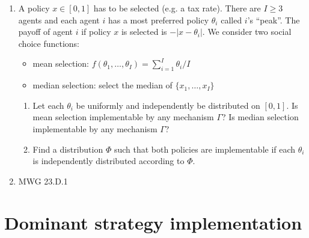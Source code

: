 \documentclass[a4paper,12pt]{article}
\begin{document}
\begin{enumerate}
\item A policy $x\in[0,1]$ has to be selected (e.g. a tax rate). There are $I\geq 3$ agents and each agent $i$ has a most preferred policy $\theta _i$ called $i$'s ``peak''. The payoff of agent $i$ if policy $x$ is selected is $-|x-\theta _i|$. We consider two social choice functions:
  \begin{itemize}
  \item mean selection: $f(\theta _1,\dots,\theta _I)=\sum_{i=1}^I\theta _i/I$
    \item median selection: select the median of $\{x_1,\dots,x_I\}$
  \end{itemize}
  \begin{enumerate}
  \item Let each $\theta _i$ be uniformly and independently be distributed on $[0,1]$. Is mean selection implementable by any mechanism $\Gamma$? Is median selection implementable by any mechanism $\Gamma$?
    \item Find a distribution $\Phi$ such that both policies are implementable if each $\theta _i$ is independently distributed according to $\Phi$.
    \end{enumerate}
    \item MWG 23.D.1
    \end{enumerate}

\section{Dominant strategy implementation}
\label{sec:domin-strat-impl}
\end{document}
